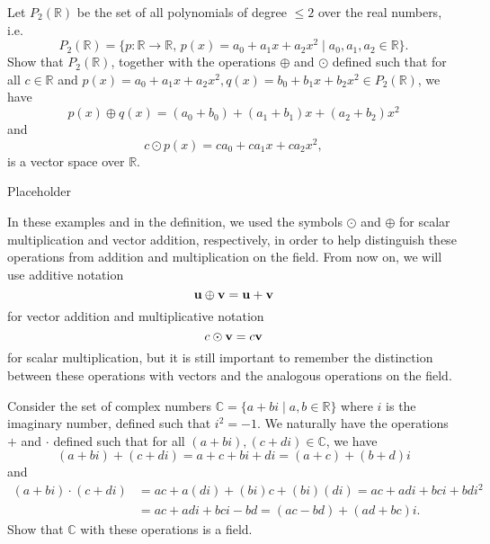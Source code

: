 \begin{exmp}
Let $ P_2(\mathbb{R}) $ be the set of all polynomials of degree $ \leq 2 $ over the real numbers, i.e.
\begin{equation*}
    P_2(\mathbb{R})=\{p:\mathbb{R}\to\mathbb{R},\,p(x)=a_0+a_1x+a_2x^2\mid a_0,a_1,a_2\in\mathbb{R}\}.
\end{equation*}
Show that $ P_2(\mathbb{R}) $, together with the operations $ \oplus $ and $ \odot $ defined such that for all $ c\in\mathbb{R} $ and $ p(x)=a_0+a_1x+a_2x^2,q(x)=b_0+b_1x+b_2x^2\in P_2(\mathbb{R}) $, we have
\begin{equation*}
    p(x)\oplus q(x)=(a_0+b_0)+(a_1+b_1)x+(a_2+b_2)x^2
\end{equation*}
and
\begin{equation*}
    c\odot p(x)=ca_0+ca_1x+ca_2x^2,
\end{equation*}
is a vector space over $ \mathbb{R} $.
\end{exmp}
\begin{sltn}
Placeholder
\end{sltn}

In these examples and in the definition, we used the symbols $ \odot $ and $ \oplus $ for scalar multiplication and vector addition, respectively, in order to help distinguish these operations from addition and multiplication on the field. From now on, we will use additive notation
\begin{equation*}
    \boldsymbol{\mathbf{u}}\oplus\boldsymbol{\mathbf{v}}=\boldsymbol{\mathbf{u}}+\boldsymbol{\mathbf{v}}
\end{equation*}
for vector addition and multiplicative notation
\begin{equation*}
    c\odot\boldsymbol{\mathbf{v}}=c\boldsymbol{\mathbf{v}}
\end{equation*}
for scalar multiplication, but it is still important to remember the distinction between these operations with vectors and the analogous operations on the field.


\begin{exer}\label{exer:cfield}
Consider the set of complex numbers $ \mathbb{C}=\{a+bi\mid a,b\in\mathbb{R}\} $ where $ i $ is the imaginary number, defined such that $ i^2=-1 $. We naturally have the operations $ + $ and $ \cdot $ defined such that for all $ (a+bi),(c+di)\in\mathbb{C} $, we have
\begin{equation*}
    (a+bi)+(c+di)=a+c+bi+di=(a+c)+(b+d)i
\end{equation*}
and
\begin{align*}
    (a+bi)\cdot(c+di) &= ac+a(di)+(bi)c+(bi)(di)=ac+adi+bci+bdi^2 \\
    &= ac+adi+bci-bd=(ac-bd)+(ad+bc)i.
\end{align*}
Show that $ \mathbb{C} $ with these operations is a field.
\end{exer}

